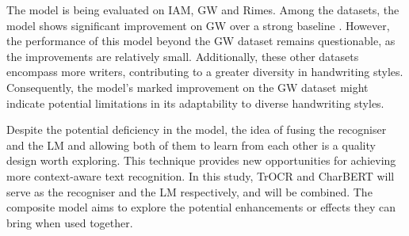 The model is being evaluated on IAM, GW and Rimes. Among the datasets, the model shows significant improvement on GW over a strong baseline \citep{8395102}. However, the performance of this model beyond the GW dataset remains questionable, as the improvements are relatively small. Additionally, these other datasets encompass more writers, contributing to a greater diversity in handwriting styles. Consequently, the model's marked improvement on the GW dataset might indicate potential limitations in its adaptability to diverse handwriting styles.

Despite the potential deficiency in the model, the idea of fusing the recogniser and the LM and allowing both of them to learn from each other is a quality design worth exploring. This technique provides new opportunities for achieving more context-aware text recognition. In this study, TrOCR and CharBERT will serve as the recogniser and the LM respectively, and will be combined. The composite model aims to explore the potential enhancements or effects they can bring when used together.